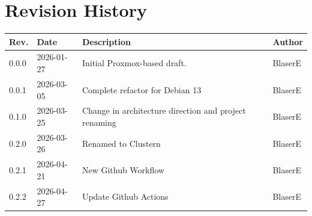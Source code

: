 \chapter*{Revision History}

\noindent %
\begin{tabularx}{\textwidth}{l l X l}
	\toprule
	\textbf{Rev.} & \textbf{Date} & \textbf{Description} & \textbf{Author} \\ \midrule
	0.0.0 & 2026-01-27 & Initial Proxmox-based draft. & BlaserE \\
	0.0.1 & 2026-03-05 & Complete refactor for Debian 13 & BlaserE \\ 
	0.1.0 & 2026-03-25 & Change in architecture direction and project renaming & BlaserE \\
	0.2.0 & 2026-03-26 & Renamed to Clustern & BlaserE \\ 
	0.2.1 & 2026-04-21 & New Github Workflow & BlaserE \\
	0.2.2 & 2026-04-27 & Update Github Actions & BlaserE \\ \bottomrule
\end{tabularx}